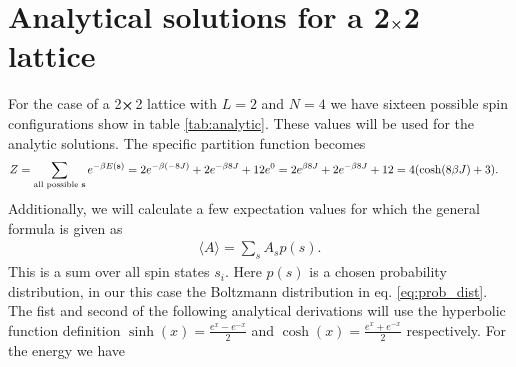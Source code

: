 \documentclass[english,notitlepage,reprint,nofootinbib]{revtex4-1}  %
\begin{document}
\onecolumngrid

%


\newpage
\appendix
\raggedbottom

\section{Analytical solutions for a 2$\cross$2 lattice}\label{appendix:analytic}
For the case of a 2$\cross$2 lattice with $L=2$ and $N=4$ we have sixteen possible spin configurations show in table \ref{tab:analytic}. These values will be used for the analytic solutions. The specific partition function becomes
\begin{align*}
    Z & =  \sum_{\text{all possible \textbf{s}}} e^{- \beta E(\textbf{s})}
    = 2e^{- \beta (-8J)} + 2e^{- \beta 8J} + 12e^0
    = 2 e^{\beta 8J} + 2 e^{- \beta 8J} + 12
    = 4 (\cosh(8 \beta J) + 3).
\end{align*}
Additionally, we will calculate a few expectation values for which the general formula is given as
\begin{align*}
    \langle A \rangle = \sum_s A_s p(s).
\end{align*}
This is a sum over all spin states $s_i$. Here $p(s)$ is a chosen probability distribution, in our this case the Boltzmann distribution in eq. \ref{eq:prob_dist}. The fist and second of the following analytical derivations will use the hyperbolic function definition $\sinh(x) = \frac{e^x - e^{-x}}{2}$ and $\cosh(x) = \frac{e^x + e^{-x}}{2}$ respectively. For the energy we have
\end{document}
